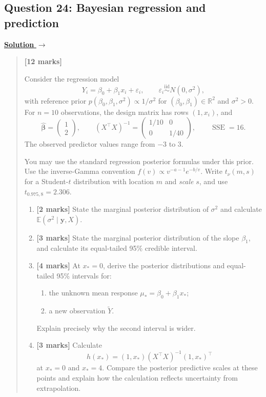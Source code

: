 \documentclass[11pt,a4paper]{article}
\newcommand{\E}{\mathbb{E}}
\newenvironment{examquestion}[2]
  {\subsection{#1}\label{question:\arabic{subsection}}\label{#2}%
   \noindent\hyperref[answer:\arabic{subsection}]{\textbf{Solution} $\rightarrow$}%
   \begin{quote}\color{statgrey}}
  {\end{quote}}
\begin{document}
\clearpage

\begin{examquestion}{Question 24: Bayesian regression and prediction}{question:practice-bayesian-regression-and-prediction}
\textbf{[12 marks]}

Consider the regression model
\[
Y_i=\beta_0+\beta_1x_i+\varepsilon_i,
\qquad
\varepsilon_i\overset{\mathrm{iid}}{\sim}N(0,\sigma^2),
\]
with reference prior
$p(\beta_0,\beta_1,\sigma^2)\propto1/\sigma^2$ for
$(\beta_0,\beta_1)\in\mathbb{R}^2$ and $\sigma^2>0$.
For $n=10$ observations, the design matrix has rows $(1,x_i)$, and
\[
\widehat{\boldsymbol\beta}=\begin{pmatrix}1\\2\end{pmatrix},
\qquad
(X^\top X)^{-1}=\begin{pmatrix}1/10&0\\0&1/40\end{pmatrix},
\qquad \operatorname{SSE}=16.
\]
The observed predictor values range from $-3$ to $3$.

You may use the standard regression posterior formulas under this prior.
Use the inverse-Gamma convention $f(v)\propto v^{-a-1}e^{-b/v}$.
Write $t_\nu(m,s)$ for a Student-$t$ distribution with location $m$ and
\emph{scale} $s$, and use $t_{0.975,8}=2.306$.
\begin{enumerate}[label=(\alph*)]
  \item \textbf{[2 marks]} State the marginal posterior distribution of
        $\sigma^2$ and calculate $\E(\sigma^2\mid\mathbf y,X)$.
  \item \textbf{[3 marks]} State the marginal posterior distribution of the
        slope $\beta_1$, and calculate its equal-tailed 95\% credible interval.
  \item \textbf{[4 marks]} At $x_*=0$, derive the posterior distributions
        and equal-tailed 95\% intervals for:
        \begin{enumerate}[label=(\roman*)]
          \item the unknown mean response $\mu_*=\beta_0+\beta_1x_*$;
          \item a new observation $\widetilde Y$.
        \end{enumerate}
        Explain precisely why the second interval is wider.
  \item \textbf{[3 marks]} Calculate
        \[
        h(x_*)=(1,x_*)(X^\top X)^{-1}(1,x_*)^\top
        \]
        at $x_*=0$ and $x_*=4$. Compare the posterior predictive scales at
        these points and explain how the calculation reflects uncertainty
        from extrapolation.
\end{enumerate}
\end{examquestion}
\end{document}
